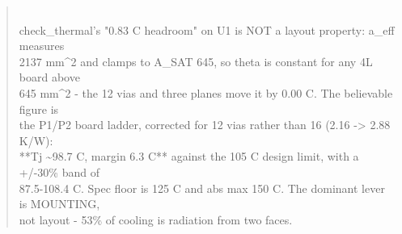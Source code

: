 \documentclass[11pt,a4paper]{article}
\begin{document}
\begin{quote}
~\\
check\_thermal's "0.83 C headroom" on U1 is NOT a layout property: a\_eff measures\\
2137 mm\textasciicircum{}2 and clamps to A\_SAT 645, so theta is constant for any 4L board above\\
645 mm\textasciicircum{}2 - the 12 vias and three planes move it by 0.00 C. The believable figure is\\
the P1/P2 board ladder, corrected for 12 vias rather than 16 (2.16 -\textgreater{} 2.88 K/W):\\
{*}{*}Tj \textasciitilde{}98.7 C, margin 6.3 C{*}{*} against the 105 C design limit, with a +/-30\% band of\\
87.5-108.4 C. Spec floor is 125 C and abs max 150 C. The dominant lever is MOUNTING,\\
not layout - 53\% of cooling is radiation from two faces.
\end{quote}
\end{document}
